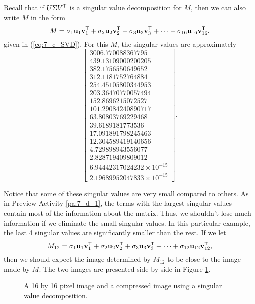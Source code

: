Recall that if $U \Sigma V^{\mathsf{T}}$ is a singular value decomposition for $M$, then we can also write $M$ in the form
\[M=\sigma_1 \mathbf{u}_1\mathbf{v}_1^{\mathsf{T}} + \sigma_2 \mathbf{u}_2\mathbf{v}_2^{\mathsf{T}} + \sigma_3 \mathbf{u}_3\mathbf{v}_3^{\mathsf{T}} + \cdots + \sigma_{16} \mathbf{u}_{16}\mathbf{v}_{16}^{\mathsf{T}}.\]
given in (\ref{eq:7_c_SVD}). For this $M$, the singular values are approximately
\begin{equation} \left[ \begin {array}{c}  3006.770088367795 \\ 439.13109000200205 \\ 382.1756550649652 \\ 312.1181752764884 \\ 254.45105800344953 \\ 203.36470770057494 \\ 152.8696215072527 \\ 101.29084240890717 \\ 63.80803769229468 \\ 39.6189181773536 \\ 17.091891798245463 \\ 12.304589419140656 \\ 4.729898943556077 \\ 2.828719409809012 \\ 6.94442317024232 \times 10^{-15} \\2.19689952047833 \times 10^{-15} \end {array} \right]. \label{eq:7_c_Flower_sing_values}
\end{equation}

Notice that some of these singular values are very small compared to others. As in Preview Activity \ref{pa:7_d_1}, the terms with the largest singular values contain most of the information about the matrix.  Thus, we shouldn't lose much information if we eliminate the small singular values. In this particular example, the last 4 singular values are significantly smaller than the rest. If we let
\[M_{12} = \sigma_1 \mathbf{u}_1\mathbf{v}_1^{\mathsf{T}} + \sigma_2 \mathbf{u}_2\mathbf{v}_2^{\mathsf{T}} + \sigma_3 \mathbf{u}_3\mathbf{v}_3^{\mathsf{T}} + \cdots + \sigma_{12} \mathbf{u}_{12}\mathbf{v}_{12}^{\mathsf{T}},\]
then we should expect the image determined by $M_{12}$ to be close to the image made by $M$. The two images are presented side by side in Figure \ref{F:7_c_Compress}.
\begin{figure}[h]
\begin{center}
 \hspace{0.5in} 
\end{center}
\caption{{\scriptsize A 16 by 16 pixel image and a compressed image using a singular value decomposition.}}
\label{F:7_c_Compress}
\end{figure}

